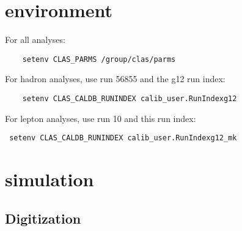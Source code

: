\documentclass[10pt,twocolumn,oneside,letterpaper]{article}
\begin{document}
\renewcommand{\thefootnote}{\fnsymbol{footnote}}

\pagestyle{headings}


\section{environment}

\small

For all analyses:
\begin{verbatim}
    setenv CLAS_PARMS /group/clas/parms
\end{verbatim}
For hadron analyses, use run 56855 and the g12 run index:
\begin{verbatim}
    setenv CLAS_CALDB_RUNINDEX calib_user.RunIndexg12
\end{verbatim}
For lepton analyses, use run 10 and this run index:
\begin{verbatim}
 setenv CLAS_CALDB_RUNINDEX calib_user.RunIndexg12_mk
\end{verbatim}

\section{simulation}

\subsection{Digitization}
\end{document}
